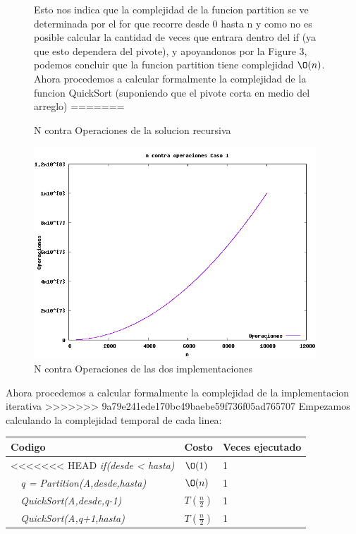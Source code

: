 \documentclass[spanish]{article}
\begin{document}
\begin{figure}[h!]
\begin{center}
\begin{table}[H]
\begin{tabular}{|l|l|l|}
			\end{tabular}
		\end{table}										
	\end{center}
	Esto nos indica que la complejidad de la funcion partition se ve determinada por el for que recorre desde 0 hasta n y como no es posible calcular la cantidad de veces que entrara dentro del if (ya que esto dependera del pivote), y apoyandonos por la Figure 3, podemos concluir que la funcion partition tiene complejidad $\O(n)$.\\			
	Ahora procedemos a calcular formalmente la complejidad de la funcion QuickSort (suponiendo que el pivote corta en medio del arreglo)
=======
		\caption{N contra Operaciones de la solucion recursiva}
	\end{figure}
	\begin{figure}[H]
		\centering
		\includegraphics[width=400px,height=300px]{grafica3}
		\caption{N contra Operaciones de las dos implementaciones}
	\end{figure}
	Ahora procedemos a calcular formalmente la complejidad de la implementacion iterativa
>>>>>>> 9a79e241ede170bc49baebe59f736f05ad765707
	Empezamos calculando la complejidad temporal de cada linea:
	\begin{center}
		\begin{table}[H]
			\begin{tabular}{|l|l|l|}
				\hline
				\rowcolor[HTML]{FFCC67} 
				Codigo                           & Costo & Veces ejecutado \\ \hline
<<<<<<< HEAD
				\textit{if(desde < hasta)}                    & $\O(1)$    & 1               \\ \hline
				\textit{\  \  q = Partition(A,desde,hasta)}                    & $\O(n)$    & 1               \\ \hline
				\textit{\  \  QuickSort(A,desde,q-1)}                    & $T(\frac{n}{2})$    & 1               \\ \hline						
				\textit{\  \  QuickSort(A,q+1,hasta)}                    & $T(\frac{n}{2})$    & 1               \\ \hline						
			\end{tabular}
		\end{table}										
	\end{center}
\end{document}
